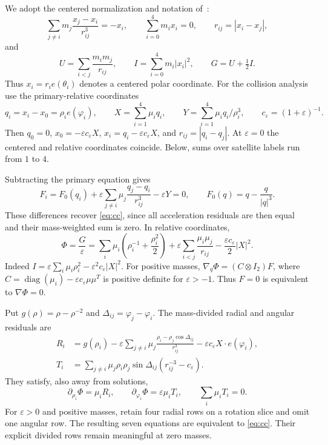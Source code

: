 \documentclass[11pt,a4paper]{article}
\numberwithin{equation}{section}
\theoremstyle{remark}
\newcommand{\eps}{\varepsilon}
\newcommand{\diag}{\operatorname{diag}}
\begin{document}
We adopt the centered normalization and notation of~\cite[Section~2]{CCLM}:
\begin{equation}\label{eq:cc}
 \sum_{j\ne i}m_j\frac{x_j-x_i}{r_{ij}^3}=-x_i,\qquad
 \sum_{i=0}^4m_ix_i=0,\qquad r_{ij}=|x_i-x_j|,
\end{equation}
and
\begin{equation}\label{eq:UI}
 U=\sum_{i<j}\frac{m_im_j}{r_{ij}},\qquad
 I=\sum_{i=0}^4m_i|x_i|^2,\qquad G=U+\tfrac12 I.
\end{equation}
Thus $x_i=r_ie(\theta_i)$ denotes a centered polar coordinate. For the collision analysis use the primary-relative coordinates
\[
 q_i=x_i-x_0=\rho_i e(\varphi_i),\qquad
 X=\sum_{i=1}^4\mu_iq_i,\qquad
 Y=\sum_{i=1}^4\mu_iq_i/\rho_i^3,\qquad c_\eps=(1+\eps)^{-1}.
\]
Then $q_0=0$, $x_0=-\eps c_\eps X$, $x_i=q_i-\eps c_\eps X$, and $r_{ij}=|q_i-q_j|$.
At $\eps=0$ the centered and relative coordinates coincide. Below, sums over satellite labels run from $1$ to $4$.

Subtracting the primary equation gives
\begin{equation}\label{eq:G}
 F_i=F_0(q_i)+\eps\sum_{j\ne i}\mu_j\frac{q_j-q_i}{r_{ij}^3}-\eps Y=0,
 \qquad F_0(q)=q-\frac q{|q|^3}.
\end{equation}
These differences recover \eqref{eq:cc}, since all acceleration residuals are then equal and their mass-weighted sum is zero. In relative coordinates,
\begin{equation}\label{eq:action}
 \Phi=\frac G\eps
 =\sum_i\mu_i\left(\rho_i^{-1}+\frac{\rho_i^2}{2}\right)
 +\eps\sum_{i<j}\frac{\mu_i\mu_j}{r_{ij}}
 -\frac{\eps c_\eps}{2}|X|^2.
\end{equation}
Indeed $I=\eps\sum_i\mu_i\rho_i^2-\eps^2c_\eps|X|^2$.
For positive masses, $\nabla_q\Phi=(C\otimes I_2)F$, where
$C=\diag(\mu_i)-\eps c_\eps\mu\mu^T$ is positive definite for $\eps>-1$.
Thus $F=0$ is equivalent to $\nabla\Phi=0$.

Put $g(\rho)=\rho-\rho^{-2}$ and $\Delta_{ij}=\varphi_j-\varphi_i$.
The mass-divided radial and angular residuals are
\begin{align}
 R_i&=g(\rho_i)-\eps\sum_{j\ne i}\mu_j
       \frac{\rho_i-\rho_j\cos\Delta_{ij}}{r_{ij}^3}
       -\eps c_\eps X\cdot e(\varphi_i),\label{eq:R}\\
 T_i&=\sum_{j\ne i}\mu_j\rho_i\rho_j\sin\Delta_{ij}
       (r_{ij}^{-3}-c_\eps).\label{eq:T}
\end{align}
They satisfy, also away from solutions,
\begin{equation}\label{eq:polar-gradient}
 \partial_{\rho_i}\Phi=\mu_iR_i,\qquad
 \partial_{\varphi_i}\Phi=\eps\mu_iT_i,\qquad
 \sum_i\mu_iT_i=0.
\end{equation}
For $\eps>0$ and positive masses, retain four radial rows on a rotation slice and omit one angular row. The resulting seven equations are equivalent to \eqref{eq:cc}. Their explicit divided rows remain meaningful at zero masses.
\end{document}
